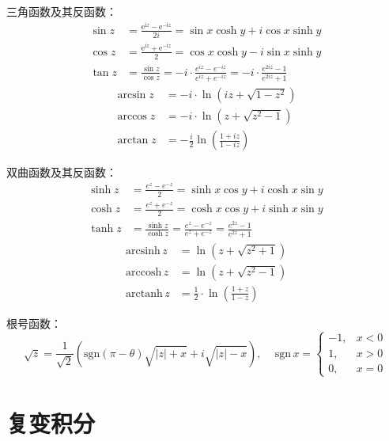\documentclass[UTF8]{report}
\def\arcsinh{\mathrm{\,arcsinh\,}}
\def\arccosh{\mathrm{\,arccosh\,}}
\def\arctanh{\mathrm{\,arctanh\,}}
\def\sgn{\mathrm{\,sgn\,}}
\theoremstyle{MyLineTheoremStyle} %
\theoremstyle{MyBlockTheoremStyle} %
\theoremstyle{MySubsubsectionStyle} %
\begin{document}
三角函数及其反函数：
\begin{align}
    \sin z
    &=\frac{\mathrm{e}^{\mathrm{i}z}-\mathrm{e}^{-\mathrm{i}z}}{2i} 
    = \sin x \cosh y + i \cos x \sinh y
    \\
    \cos z
    &=\frac{\mathrm{e}^{\mathrm{i}z}+\mathrm{e}^{-\mathrm{i}z}}{2}
    = \cos x \cosh y - i \sin x \sinh y
    \\ 
    \tan z &= \frac{\sin z}{\cos z} = -i \cdot \frac{e^{iz} - e^{-iz}}{e^{iz} + e^{-iz}} = -i \cdot \frac{e^{2iz} - 1}{e^{2iz} + 1}
\end{align}
\begin{align}
    \arcsin z &= -i \cdot \ln \left(iz + \sqrt{1 - z^2}\right) \\ 
    \arccos z &= -i \cdot \ln \left(z + \sqrt{z^2 - 1}\right) \\
    \arctan z &= -\frac{i}{2} \ln \left(\frac{1 + iz}{1 - iz}\right)
\end{align}

双曲函数及其反函数：
\begin{align}
\sinh z &= \frac{e^z - e^{-z}}{2} = \sinh x \cos y + i \cosh x \sin y\\ 
\cosh z &= \frac{e^z + e^{-z}}{2} = \cosh x \cos y + i \sinh x \sin y\\ 
\tanh z &= \frac{\sinh z}{\cosh z} = \frac{e^z - e^{-z}}{e^{z} + e^{-z}} = \frac{e^{2z} - 1}{e^{2z} + 1}
\end{align}
\begin{align}
    \arcsinh z &= \ln \left(z + \sqrt{z^2 + 1} \right) \\ 
    \arccosh z &= \ln \left(z + \sqrt{z^2 - 1} \right) \\ 
    \arctanh z &= \frac{1}{2}\cdot \ln \left(\frac{1 + z}{1 - z}\right)
\end{align}

根号函数：
\begin{equation}
    \sqrt{z} = \frac{1}{\sqrt{2}} \left( \text{sgn}(\pi -\theta) \sqrt{| z | + x} + i \sqrt{| z | - x}  \right),\quad 
    \sgn x = \begin{cases}
        -1, & x < 0 \\
        1, & x > 0 \\ 
        0, & x = 0  
    \end{cases}
\end{equation}

\chapter{复变积分}
\end{document}
